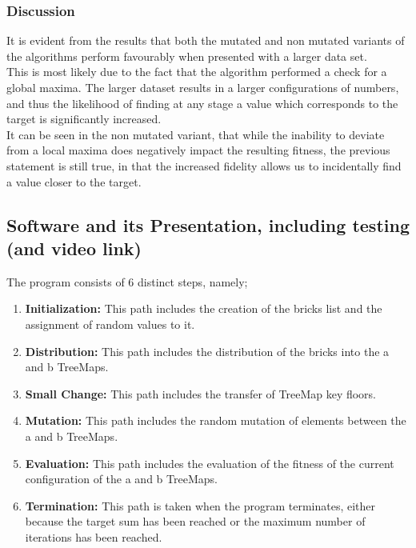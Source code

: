 \documentclass[a4paper]{article}
\begin{document}
\subsubsection{Discussion}

It is evident from the results that both the mutated and non mutated variants
of the algorithms perform favourably when presented with a larger data set. \\

This is most likely due to the fact that the algorithm performed a check for 
a global maxima.
The larger dataset results in a larger configurations of numbers,
and thus the likelihood of finding at any stage a value which 
corresponds to the target is significantly increased. \\

It can be seen in the non mutated variant, that while the inability to deviate from
a local maxima does negatively impact the resulting fitness, the previous statement is still true, 
in that the increased fidelity allows us to incidentally find a value closer to the target.



\newpage
\subsection{Software and its Presentation, including testing (and video link)}
\vspace{4mm}
The program consists of 6 distinct steps, namely;
\vspace{4mm}
\begin{enumerate}
  \item \textbf{Initialization:} This path includes the creation of the bricks list and the assignment of random values to it.
  \item \textbf{Distribution:} This path includes the distribution of the bricks into the a and b TreeMaps.
  \item \textbf{Small Change:} This path includes the transfer of TreeMap key floors.
  \item \textbf{Mutation:} This path includes the random mutation of elements between the a and b TreeMaps.
  \item \textbf{Evaluation:} This path includes the evaluation of the fitness of the current configuration of the a and b TreeMaps.
  \item \textbf{Termination:} This path is taken when the program terminates, either because the target sum has been reached or the maximum number of iterations has been reached.
  \end{enumerate}
\end{document}

